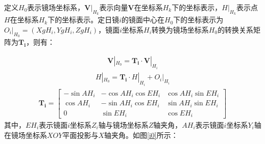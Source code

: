 \documentclass[withoutpreface,bwprint]{cumcmthesis} %
\begin{document}
定义$H_0$表示镜场坐标系，$\mathbf{V}|_{H_k}$表示向量$\mathbf{V}$在坐标系$H_k$下的坐标表示，$H|_{H_k}$表示点$H$在坐标系$H_k$下的坐标表示。定日镜$i$的镜面中心在$H_0$下的坐标表示为$O_i|_{H_0}=(XgH_i,YgH_i,ZgH_i)$，镜面$i$坐标系$H_i$转换为镜场坐标系$H_0$的转换关系矩阵为$\mathbf{T_i}$，则有：

\begin{eqnarray}
\mathbf{V}|_{H_0}=\mathbf{T_i}\cdot \mathbf{V}|_{H_i}
\end{eqnarray}
\begin{eqnarray}
H|_{H_0}=\mathbf{T_i}\cdot H|_{H_i}+O_i|_{H_i}
\end{eqnarray}
\begin{eqnarray}
\mathbf{T_i}=\begin{bmatrix}
  -\sin AH_i&-\cos AH_i\cos EH_i  &\cos AH_i\sin EH_i \\
  \cos AH_i&-\sin AH_i\cos EH_i  &\sin AH_i\sin EH_i \\
  0&\sin EH_i  &\cos EH_i
\end{bmatrix}
\end{eqnarray}
其中，$EH_i$表示镜面$i$坐标系$Z_i$轴与镜场坐标系$Z$轴夹角，$AH_i$表示镜面$i$坐标系$Y_i$轴在镜场坐标系$XOY$平面投影与$X$轴夹角。如图\ref{i0}所示：
\end{document}
